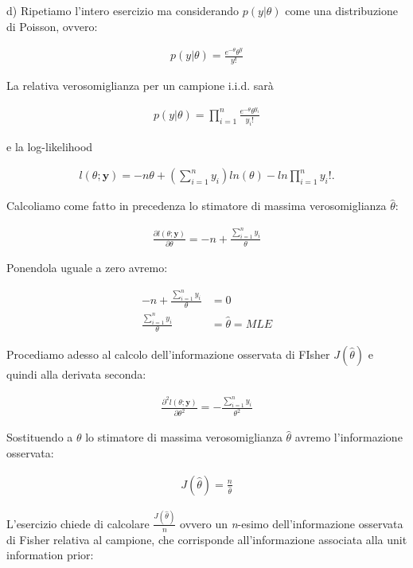 \bigskip
d) Ripetiamo l'intero esercizio ma considerando $p(y|\theta)$ come una distribuzione di Poisson, ovvero:

\begin{align*}
p(y|\theta) = \frac{e^{-\theta}\theta^y}{y!}
\end{align*}

La relativa verosomiglianza per un campione i.i.d. sarà

\begin{align*}
p(y|\theta) = \prod_{i=1}^n \frac{e^{-\theta}\theta^{y_i}}{y_i!}
\end{align*}

e la log-likelihood

\begin{align*}
l(\theta;\textbf{y}) = -n\theta + \left(\sum_{i=1}^n y_i \right)ln(\theta)-ln\prod_{i=1}^n y_i!.
\end{align*}

Calcoliamo come fatto in precedenza lo stimatore di massima verosomiglianza $\hat{\theta}$:

\begin{align*}
\frac{\partial l(\theta; \textbf{y})}{\partial\theta} = -n + \frac{\sum_{i=1}^n y_i}{\theta}
\end{align*}

Ponendola uguale a zero avremo:

\begin{align*}
 -n + \frac{\sum_{i=1}^n y_i}{\theta} &= 0\\
 \frac{\sum_{i=1}^n y_i}{\theta} &= \hat{\theta} = MLE
\end{align*}

Procediamo adesso al calcolo dell'informazione osservata di FIsher $J(\hat{\theta})$ e quindi alla derivata seconda:

\begin{align*}
\frac{\partial^2 l(\theta; \textbf{y})}{\partial\theta^2} = - \frac{\sum_{i=1}^n y_i}{\theta^2}
\end{align*}

Sostituendo a $\theta$ lo stimatore di massima verosomiglianza $\hat{\theta}$ avremo l'informazione osservata:


\begin{align*}
J(\hat{\theta}) = \frac{n}{\hat{\theta}}
\end{align*}

L'esercizio chiede di calcolare $\frac{J(\hat{\theta})}{n}$ ovvero un \textit{n}-esimo dell'informazione osservata di Fisher relativa al campione, che corrisponde all'informazione associata alla unit information prior:

